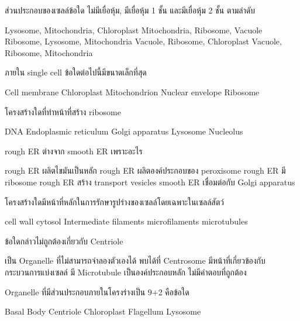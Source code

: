 \documentclass[12pt, a4paper]{exam}
\begin{document}
\begin{questions}
\filbreak
  \question ส่วนประกอบของเซลล์ข้อใด ไม่มีเยื่อหุ้ม, มีเยื่อหุ้ม 1 ชั้น และมีเยื่อหุ้ม 2 ชั้น ตามลำดับ
  \begin{choices}
    \choice Lysosome, Mitochondria, Chloroplast
    \choice Mitochondria, Ribosome, Vacuole
    \choice Ribosome, Lysosome, Mitochondria
    \choice Vacuole, Ribosome, Chloroplast
    \choice Vacuole, Ribosome, Mitochondria
\end{choices}

\filbreak
  \question ภายใน single cell ข้อใดต่อไปนี้มีขนาดเล็กที่สุด
  \begin{choices}
    \choice Cell membrane
    \choice Chloroplast
    \choice Mitochondrion
    \choice Nuclear envelope
    \choice Ribosome
\end{choices}

\filbreak
  \question โครงสร้างใดที่ทำหน้าที่สร้าง ribosome
  \begin{choices}
    \choice DNA
    \choice Endoplasmic reticulum
    \choice Golgi apparatus
    \choice Lysosome
    \choice Nucleolus
\end{choices}

\filbreak
  \question rough ER ต่างจาก smooth ER เพราะอะไร
  \begin{choices}
    \choice rough ER ผลิตไขมันเป็นหลัก
    \choice rough ER ผลิตองค์ประกอบของ peroxisome
    \choice rough ER มี ribosome
    \choice rough ER สร้าง transport vesicles
    \choice smooth ER เชื่อมต่อกับ Golgi apparatus
\end{choices}

\filbreak
  \question โครงสร้างใดมีหน้าที่หลักในการรักษารูปร่างของเซลล์โดยเฉพาะในเซลล์สัตว์
  \begin{choices}
    \choice cell wall
    \choice cytosol
    \choice Intermediate filaments
    \choice microfilaments
    \choice microtubules
\end{choices}

\filbreak
  \question ข้อใดกล่าวไม่ถูกต้องเกี่ยวกับ Centriole
  \begin{choices}
    \choice เป็น Organelle ที่ไม่สามารถจำลองตัวเองได้
    \choice พบได้ที่ Centrosome
    \choice มีหน้าที่เกี่ยวข้องกับกระบวนการแบ่งเซลล์
    \choice มี Microtubule เป็นองค์ประกอบหลัก
    \choice ไม่มีคำตอบที่ถูกต้อง
\end{choices}

\filbreak
  \question Organelle ที่มีส่วนประกอบภายในโครงร่างเป็น 9+2 คือข้อใด
  \begin{choices}
    \choice Basal Body
    \choice Centriole
    \choice Chloroplast
    \choice Flagellum
    \choice Lysosome
\end{choices}


\end{questions}
\end{document}
